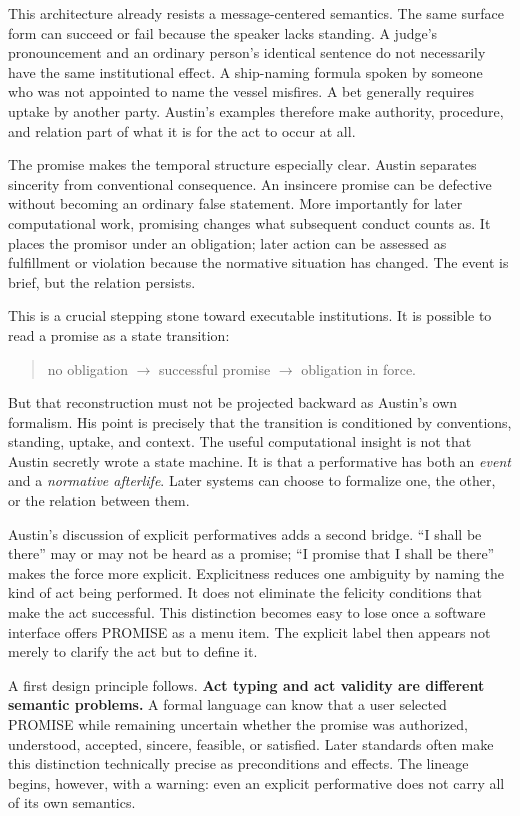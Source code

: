 \documentclass[11pt]{article}
\begin{document}
This architecture already resists a message-centered semantics. The same surface form can succeed or fail because the speaker lacks standing. A judge's pronouncement and an ordinary person's identical sentence do not necessarily have the same institutional effect. A ship-naming formula spoken by someone who was not appointed to name the vessel misfires. A bet generally requires uptake by another party. Austin's examples therefore make authority, procedure, and relation part of what it is for the act to occur at all. \cite{austin1962things}

The promise makes the temporal structure especially clear. Austin separates sincerity from conventional consequence. An insincere promise can be defective without becoming an ordinary false statement. More importantly for later computational work, promising changes what subsequent conduct counts as. It places the promisor under an obligation; later action can be assessed as fulfillment or violation because the normative situation has changed. The event is brief, but the relation persists. \cite{austin1962things}

This is a crucial stepping stone toward executable institutions. It is possible to read a promise as a state transition:

\begin{quote}
no obligation $\rightarrow$ successful promise $\rightarrow$ obligation in force.
\end{quote}

But that reconstruction must not be projected backward as Austin's own formalism. His point is precisely that the transition is conditioned by conventions, standing, uptake, and context. The useful computational insight is not that Austin secretly wrote a state machine. It is that a performative has both an \emph{event} and a \emph{normative afterlife}. Later systems can choose to formalize one, the other, or the relation between them.

Austin's discussion of explicit performatives adds a second bridge. ``I shall be there'' may or may not be heard as a promise; ``I promise that I shall be there'' makes the force more explicit. Explicitness reduces one ambiguity by naming the kind of act being performed. It does not eliminate the felicity conditions that make the act successful. This distinction becomes easy to lose once a software interface offers PROMISE as a menu item. The explicit label then appears not merely to clarify the act but to define it.

A first design principle follows. \textbf{Act typing and act validity are different semantic problems.} A formal language can know that a user selected PROMISE while remaining uncertain whether the promise was authorized, understood, accepted, sincere, feasible, or satisfied. Later standards often make this distinction technically precise as preconditions and effects. The lineage begins, however, with a warning: even an explicit performative does not carry all of its own semantics.
\end{document}
